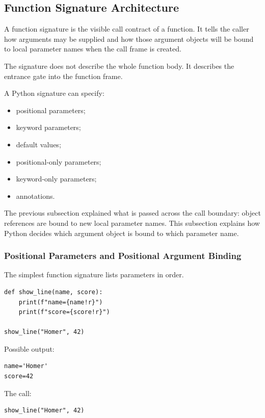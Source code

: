 \subsection{Function Signature Architecture}

A function signature is the visible call contract of a function. It tells the caller how arguments may be supplied and how those argument objects will be bound to local parameter names when the call frame is created.

The signature does not describe the whole function body. It describes the entrance gate into the function frame.

A Python signature can specify:

\begin{itemize}
    \item positional parameters;
    \item keyword parameters;
    \item default values;
    \item positional-only parameters;
    \item keyword-only parameters;
    \item annotations.
\end{itemize}

The previous subsection explained what is passed across the call boundary: object references are bound to new local parameter names. This subsection explains how Python decides which argument object is bound to which parameter name.

\subsubsection{Positional Parameters and Positional Argument Binding}

The simplest function signature lists parameters in order.

\begin{verbatim}
def show_line(name, score):
    print(f"name={name!r}")
    print(f"score={score!r}")

show_line("Homer", 42)
\end{verbatim}

Possible output:

\begin{verbatim}
name='Homer'
score=42
\end{verbatim}

The call:

\begin{verbatim}
show_line("Homer", 42)
\end{verbatim}


